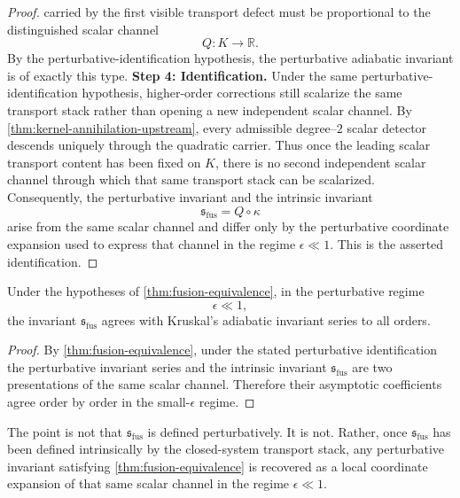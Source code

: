 \begin{proof}
	carried by the first visible transport defect must be proportional to
	the distinguished scalar channel
	\[
		Q:K\to\mathbb R.
	\]
	By the perturbative-identification hypothesis, the perturbative
	adiabatic invariant is of exactly this type.
	\medskip
	\noindent
	\textbf{Step 4: Identification.}
	Under the same perturbative-identification hypothesis, higher-order
	corrections still scalarize the same transport stack rather than opening
	a new independent scalar channel.
	By \cref{thm:kernel-annihilation-upstream}, every admissible degree--\(2\)
	scalar detector descends uniquely through the quadratic carrier.
	Thus once the leading scalar transport content has been fixed on \(K\),
	there is no second independent scalar channel through which that same
	transport stack can be scalarized.
	Consequently, the perturbative invariant and the intrinsic invariant
	\[
		\mathfrak s_{\mathrm{fus}}=Q\circ\kappa
	\]
	arise from the same scalar channel and differ only by the perturbative
	coordinate expansion used to express that channel in the regime
	\(\epsilon\ll1\).
	This is the asserted identification.
\end{proof}
\begin{corollary}
	Under the hypotheses of \cref{thm:fusion-equivalence}, in the
	perturbative regime
	\[
		\epsilon\ll 1,
	\]
	the invariant \(\mathfrak s_{\mathrm{fus}}\) agrees with Kruskal's adiabatic invariant series to
	all orders.
\end{corollary}
\begin{proof}
	By \cref{thm:fusion-equivalence}, under the stated perturbative
	identification the perturbative invariant series and the intrinsic
	invariant \(\mathfrak s_{\mathrm{fus}}\) are two presentations of the same scalar channel.
	Therefore their asymptotic coefficients agree order by order in the
	small-\(\epsilon\) regime.
\end{proof}
\begin{remark}
	The point is not that \(\mathfrak s_{\mathrm{fus}}\) is defined perturbatively.
	It is not.
	Rather, once \(\mathfrak s_{\mathrm{fus}}\) has been defined intrinsically by the closed-system
	transport stack, any perturbative invariant satisfying
	\cref{thm:fusion-equivalence} is recovered as a local coordinate
	expansion of that same scalar channel in the regime
	\(\epsilon\ll1\).
\end{remark}
